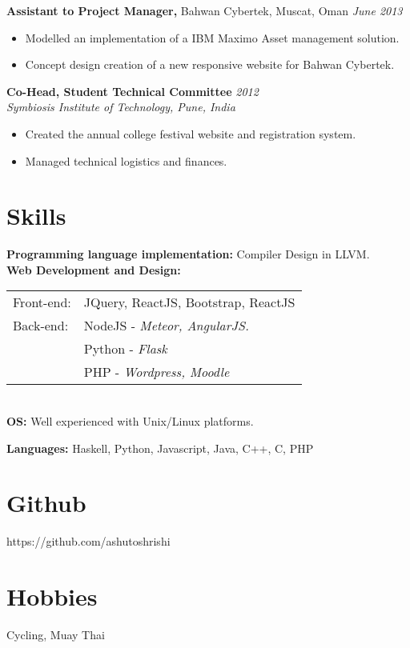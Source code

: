 \documentclass[margin]{res}
\begin{document}
\begin{resume}
  \textbf{Assistant to Project Manager,} Bahwan Cybertek, Muscat, Oman
  \hfill \textit{June 2013}
  \begin{itemize} \itemsep -2pt
  \item Modelled an implementation of a IBM Maximo Asset management solution.
  \item Concept design creation of a new responsive website for Bahwan Cybertek.
  \end{itemize}
  
  \textbf{Co-Head, Student Technical Committee}   \hfill \textit{2012} \\
  \textit{Symbiosis Institute of Technology, Pune, India}
  \begin{itemize} \itemsep -2pt
  \item Created the annual college festival website and registration system.
  \item Managed technical logistics and finances.
  \end{itemize}

  \section{Skills}  
  \textbf{Programming language implementation:} Compiler Design in LLVM. \\
  \textbf{Web Development and Design:} \\
  \begin{tabular}{l l}
    Front-end: & JQuery, ReactJS, Bootstrap, ReactJS \\
    Back-end: & NodeJS -  \textit{Meteor, AngularJS.}\\ 
              & Python -  \textit{Flask} \\
              & PHP -  \textit{Wordpress, Moodle} \\

  \end{tabular}\\
  \textbf{OS:} Well experienced with Unix/Linux platforms.
  
  \textbf{Languages:} Haskell, Python, Javascript, Java, C++, C, PHP \\ 
  
  \section{Github} 
  https://github.com/ashutoshrishi 
  \section{Hobbies}
  Cycling, Muay Thai

  
  
\end{resume}
\end{document}
